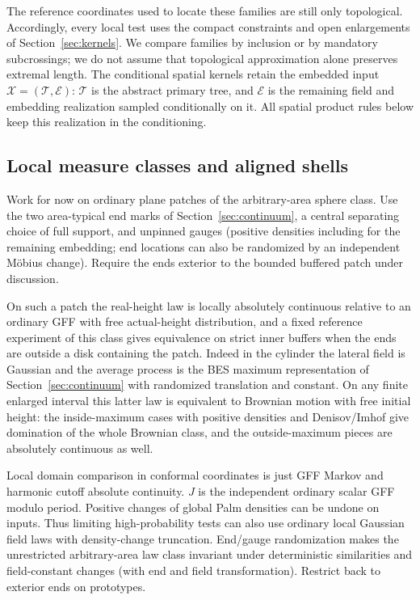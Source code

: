 The reference coordinates used to locate these families are still only
topological. Accordingly, every local test uses the compact constraints and
open enlargements of Section~\ref{sec:kernels}. We compare families by
inclusion or by mandatory subcrossings; we do not assume that topological
approximation alone preserves extremal length.
The conditional spatial kernels retain the embedded input
\(\mathcal X=(\mathcal T,\mathcal E)\): \(\mathcal T\) is the abstract
primary tree, and \(\mathcal E\) is the remaining field and embedding
realization sampled conditionally on it. All spatial product rules below
keep this realization in the conditioning.

\subsection{Local measure classes and aligned shells}
\label{conf:local-classes}

Work for now on ordinary plane patches of the arbitrary-area sphere class. Use the two area-typical
end marks of Section~\ref{sec:continuum}, a central separating choice of full support, and unpinned
gauges (positive densities including for the remaining embedding; end locations can also be
randomized by an independent Möbius change). Require the ends exterior to the bounded buffered patch
under discussion.

On such a patch the real-height law is locally absolutely continuous relative to an ordinary GFF
with free actual-height distribution, and a fixed reference experiment of this class gives
equivalence on strict inner buffers when the ends are outside a disk containing the patch. Indeed in
the cylinder the lateral field is Gaussian and the average process is the BES maximum representation
of Section~\ref{sec:continuum} with randomized translation and constant. On any finite enlarged
interval this latter law is equivalent to Brownian motion with free initial height: the
inside-maximum cases with positive densities and Denisov/Imhof give domination of the whole Brownian
class, and the outside-maximum pieces are absolutely continuous as well.

Local domain comparison in conformal coordinates is just GFF Markov and harmonic cutoff absolute
continuity. \(J\) is the independent ordinary scalar GFF modulo period. Positive changes of global
Palm densities can be undone on inputs. Thus limiting high-probability tests can also use ordinary
local Gaussian field laws with density-change truncation. End/gauge randomization makes the
unrestricted arbitrary-area law class invariant under deterministic similarities and field-constant
changes (with end and field transformation). Restrict back to exterior ends on prototypes.

